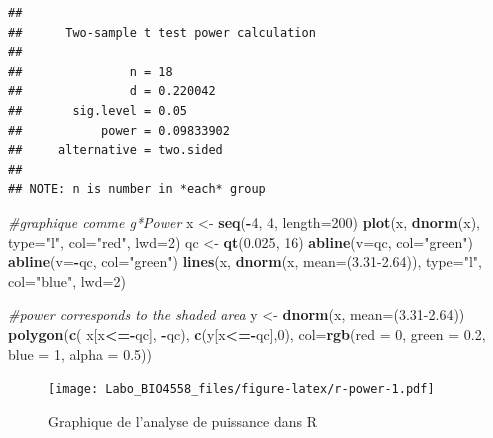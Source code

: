 \documentclass[12pt,]{book}
\newenvironment{Shaded}{\begin{snugshade}}{\end{snugshade}}
\newcommand{\CommentTok}[1]{\textcolor[rgb]{0.37,0.37,0.37}{\textit{#1}}}
\newcommand{\DataTypeTok}[1]{\textcolor[rgb]{0.27,0.27,0.27}{#1}}
\newcommand{\DecValTok}[1]{\textcolor[rgb]{0.06,0.06,0.06}{#1}}
\newcommand{\FloatTok}[1]{\textcolor[rgb]{0.06,0.06,0.06}{#1}}
\newcommand{\KeywordTok}[1]{\textcolor[rgb]{0.27,0.27,0.27}{\textbf{#1}}}
\newcommand{\NormalTok}[1]{#1}
\newcommand{\OperatorTok}[1]{\textcolor[rgb]{0.43,0.43,0.43}{\textbf{#1}}}
\newcommand{\StringTok}[1]{\textcolor[rgb]{0.5,0.5,0.5}{#1}}
\begin{document}
\begin{verbatim}
## 
##      Two-sample t test power calculation 
## 
##               n = 18
##               d = 0.220042
##       sig.level = 0.05
##           power = 0.09833902
##     alternative = two.sided
## 
## NOTE: n is number in *each* group
\end{verbatim}

\begin{Shaded}
\begin{Highlighting}[]
\CommentTok{#graphique comme g*Power}
\NormalTok{x <-}\StringTok{ }\KeywordTok{seq}\NormalTok{(}\OperatorTok{-}\DecValTok{4}\NormalTok{, }\DecValTok{4}\NormalTok{, }\DataTypeTok{length=}\DecValTok{200}\NormalTok{)}
\KeywordTok{plot}\NormalTok{(x, }\KeywordTok{dnorm}\NormalTok{(x), }\DataTypeTok{type=}\StringTok{"l"}\NormalTok{, }\DataTypeTok{col=}\StringTok{"red"}\NormalTok{, }\DataTypeTok{lwd=}\DecValTok{2}\NormalTok{)}
\NormalTok{qc <-}\StringTok{ }\KeywordTok{qt}\NormalTok{(}\FloatTok{0.025}\NormalTok{, }\DecValTok{16}\NormalTok{)}
\KeywordTok{abline}\NormalTok{(}\DataTypeTok{v=}\NormalTok{qc, }\DataTypeTok{col=}\StringTok{"green"}\NormalTok{)}
\KeywordTok{abline}\NormalTok{(}\DataTypeTok{v=}\OperatorTok{-}\NormalTok{qc, }\DataTypeTok{col=}\StringTok{"green"}\NormalTok{)}
\KeywordTok{lines}\NormalTok{(x, }\KeywordTok{dnorm}\NormalTok{(x, }\DataTypeTok{mean=}\NormalTok{(}\FloatTok{3.31-2.64}\NormalTok{)), }\DataTypeTok{type=}\StringTok{"l"}\NormalTok{, }\DataTypeTok{col=}\StringTok{"blue"}\NormalTok{, }\DataTypeTok{lwd=}\DecValTok{2}\NormalTok{)}

\CommentTok{#power corresponds to the shaded area}
\NormalTok{y <-}\StringTok{ }\KeywordTok{dnorm}\NormalTok{(x, }\DataTypeTok{mean=}\NormalTok{(}\FloatTok{3.31-2.64}\NormalTok{))}
\KeywordTok{polygon}\NormalTok{(}\KeywordTok{c}\NormalTok{( x[x}\OperatorTok{<=-}\NormalTok{qc], }\OperatorTok{-}\NormalTok{qc),  }\KeywordTok{c}\NormalTok{(y[x}\OperatorTok{<=-}\NormalTok{qc],}\DecValTok{0}\NormalTok{), }\DataTypeTok{col=}\KeywordTok{rgb}\NormalTok{(}\DataTypeTok{red =} \DecValTok{0}\NormalTok{, }\DataTypeTok{green =} \FloatTok{0.2}\NormalTok{, }\DataTypeTok{blue =} \DecValTok{1}\NormalTok{, }\DataTypeTok{alpha =} \FloatTok{0.5}\NormalTok{))}
\end{Highlighting}
\end{Shaded}

\begin{figure}
\centering
\texttt{[image: Labo\_BIO4558\_files/figure-latex/r-power-1.pdf]}
\caption{\label{fig:r-power}Graphique de l'analyse de puissance dans R}
\end{figure}
\end{document}
